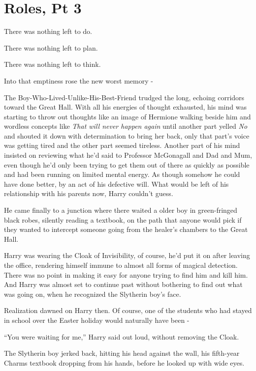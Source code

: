 \chapter{Roles, Pt 3}

There was nothing left to do.

There was nothing left to plan.

There was nothing left to think.

Into that emptiness rose the new worst memory -

The Boy-Who-Lived-Unlike-His-Best-Friend trudged the long, echoing
corridors toward the Great Hall. With all his energies of thought
exhausted, his mind was starting to throw out thoughts like an image of
Hermione walking beside him and wordless concepts like \emph{That will
never happen again} until another part yelled \emph{No} and shouted it
down with determination to bring her back, only that part's voice was
getting tired and the other part seemed tireless. Another part of his
mind insisted on reviewing what he'd said to Professor McGonagall and
Dad and Mum, even though he'd only been trying to get them out of there
as quickly as possible and had been running on limited mental energy. As
though somehow he could have done better, by an act of his defective
will. What would be left of his relationship with his parents now, Harry
couldn't guess.

He came finally to a junction where there waited a older boy in
green-fringed black robes, silently reading a textbook, on the path that
anyone would pick if they wanted to intercept someone going from the
healer's chambers to the Great Hall.

Harry was wearing the Cloak of Invisibility, of course, he'd put it on
after leaving the office, rendering himself immune to almost all forms
of magical detection. There was no point in making it easy for anyone
trying to find him and kill him. And Harry was almost set to continue
past without bothering to find out what was going on, when he recognized
the Slytherin boy's face.

Realization dawned on Harry then. Of course, one of the students who had
stayed in school over the Easter holiday would naturally have been -

``You were waiting for me,'' Harry said out loud, without removing the
Cloak.

The Slytherin boy jerked back, hitting his head against the wall, his
fifth-year Charms textbook dropping from his hands, before he looked up
with wide eyes.

